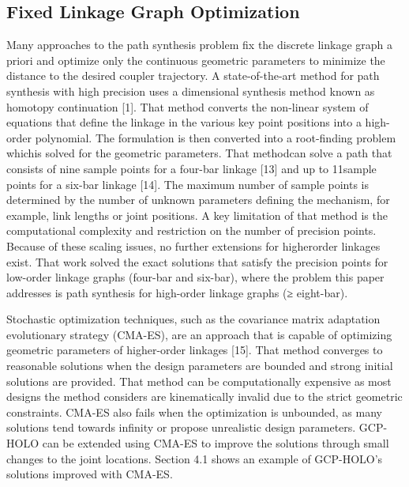 \subsection{Fixed Linkage Graph Optimization}
Many approaches to the path synthesis problem fix the discrete linkage graph a priori and optimize only the continuous geometric parameters to minimize the distance to the desired coupler trajectory. A state-of-the-art method for path synthesis with high precision uses a dimensional synthesis method known as homotopy continuation [1]. That method converts the non-linear system of equations that define the linkage in the various key point positions into a high-order polynomial. The formulation is then converted into a root-finding problem whichis solved for the geometric parameters. That methodcan solve a path that consists of nine sample points for a four-bar linkage [13] and up to 11sample points for a six-bar linkage [14]. The maximum number of sample points is determined by the number of unknown parameters defining the mechanism, for example, link lengths or joint positions. A key limitation of that method is the computational complexity and restriction on the number of precision points. Because of these scaling issues, no further extensions for higherorder linkages exist. That work solved the exact solutions that satisfy the precision points for low-order linkage graphs (four-bar and six-bar), where the problem this paper addresses is path synthesis for high-order linkage graphs (≥ eight-bar). 

Stochastic optimization techniques, such as the covariance matrix adaptation evolutionary strategy (CMA-ES), are an approach that is capable of optimizing geometric parameters of higher-order linkages [15]. That method converges to reasonable solutions when the design parameters are bounded and strong initial solutions are provided. That method can be computationally expensive as most designs the method considers are kinematically invalid due to the strict geometric constraints. CMA-ES also fails when the optimization is unbounded, as many solutions tend towards infinity or propose unrealistic design parameters. GCP-HOLO can be extended using CMA-ES to improve the solutions through small changes to the joint locations. Section 4.1 shows an example of GCP-HOLO’s solutions improved with CMA-ES. 

